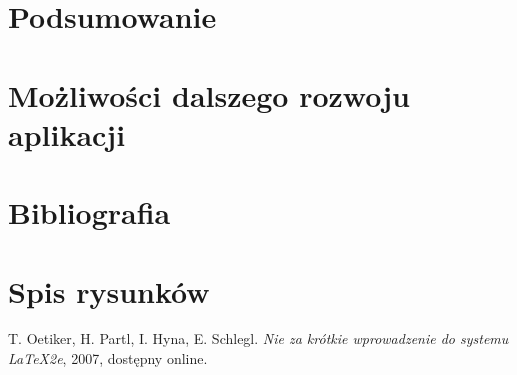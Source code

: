 \documentclass[12pt]{article}
\begin{document}
\begin{sloppypar}
{}

\section{Podsumowanie}
{

}

\section{Możliwości dalszego rozwoju aplikacji}
{

}

\section{Bibliografia}
{

}

\section{Spis rysunków}
{

}



\begin{thebibliography}{0}
   T. Oetiker, H. Partl, I. Hyna, E. Schlegl.
    \textsl{Nie za krótkie wprowadzenie do systemu \LaTeX2e}, 2007, dostępny
    online.
\end{thebibliography}

\end{sloppypar}
\end{document}
